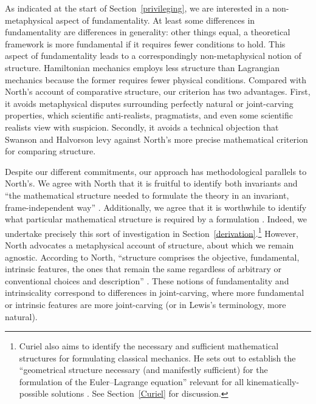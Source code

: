 \documentclass[12pt, twoside]{article}
\begin{document}
As indicated at the start of Section~\ref{privileging}, we are interested in a non-metaphysical aspect of fundamentality. At least some differences in fundamentality are differences in generality: other things equal, a theoretical framework is more fundamental if it requires fewer conditions to hold. This aspect of fundamentality leads to a correspondingly non-metaphysical notion of structure. Hamiltonian mechanics employs less structure than Lagrangian mechanics because the former requires fewer physical conditions. Compared with North's \parencites*[]{North} account of comparative structure, our criterion has two advantages. First, it avoids metaphysical disputes surrounding perfectly natural or joint-carving properties, which scientific anti-realists, pragmatists, and even some scientific realists view with suspicion. Secondly, it avoids a technical objection that Swanson and Halvorson \parencites*[]{Swanson} levy against North's more precise mathematical criterion for comparing structure. 

Despite our different commitments, our approach has methodological parallels to North's. We agree with North that it is fruitful to identify both invariants and ``the mathematical structure needed to formulate the theory in an invariant, frame-independent way'' \parencites*[65]{North}. Additionally, we agree that it is worthwhile to identify what particular mathematical structure is required by a formulation \parencites[78]{North}. Indeed, we undertake precisely this sort of investigation in Section~\ref{derivation}.\footnote{Curiel also aims to identify the necessary and sufficient mathematical structures for formulating classical mechanics. He sets out to establish the ``geometrical structure necessary (and manifestly sufficient) for the formulation of the Euler--Lagrange equation'' relevant for all kinematically-possible solutions \parencites*[292]{Curiel}. See Section~\ref{Curiel} for discussion.} However, North advocates a metaphysical account of structure, about which we remain agnostic. According to North, ``structure comprises the objective, fundamental, intrinsic features, the ones that remain the same regardless of arbitrary or conventional choices and description'' \parencites*[66]{North}. These notions of fundamentality and intrinsicality correspond to differences in joint-carving, where more fundamental or intrinsic features are more joint-carving (or in Lewis's \parencites*[]{Lewis1983} terminology, more natural). 
\end{document}
